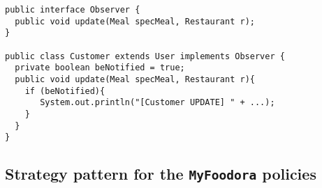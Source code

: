 \begin{lstlisting}[caption=Observer pattern for \Customer~and \Meal.,
label=lst:observer]
public interface Observer {
  public void update(Meal specMeal, Restaurant r);
}

public class Customer extends User implements Observer {
  private boolean beNotified = true;
  public void update(Meal specMeal, Restaurant r){
    if (beNotified){
       System.out.println("[Customer UPDATE] " + ...);
    }
  }
}  
\end{lstlisting}



\subsection{Strategy pattern for the \texttt{MyFoodora} policies} %
\label{sub:strategy_pattern_for_the_texttt_myfoodora_policies}

